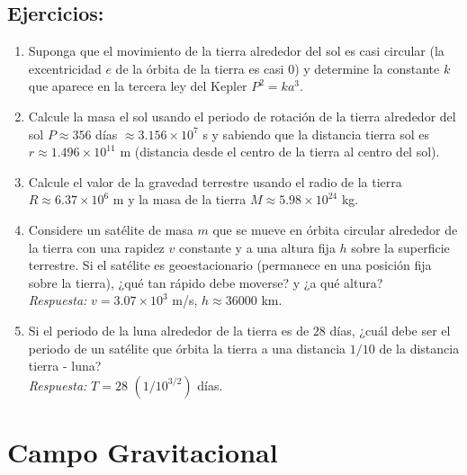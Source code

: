 \subsection{Ejercicios:}
\begin{enumerate}

\item Suponga que el movimiento de la tierra alrededor del sol es casi circular (la excentricidad $e$ de la órbita de la tierra es casi $0$) y determine la constante $k$ que aparece en la tercera ley del Kepler $P^2=ka^3$.

\item Calcule la masa el sol usando el periodo de rotación de la tierra alrededor del sol $P \approx 356$ días $\approx 3.156 \times 10^7$ s y sabiendo que la distancia tierra sol es $r \approx 1.496 \times 10^{11}$ m (distancia desde el centro de la tierra al centro del sol).

\item Calcule el valor de la gravedad terrestre usando el radio de la tierra $R\approx 6.37 \times 10^6$ m y la masa de la tierra $M \approx 5.98 \times 10^24$ kg.

\item Considere un satélite de masa $m$ que se mueve en órbita circular alrededor de la tierra con una rapidez $v$ constante y a una altura fija $h$ sobre la superficie terrestre. Si el satélite es geoestacionario (permanece en una posición fija sobre la tierra), ¿qué tan rápido debe moverse? y ¿a qué altura?\\
\textit{Respuesta:} $v=3.07 \times 10^3$ m/s, $h \approx 36000$ km.

\item Si el periodo de la luna alrededor de la tierra es de $28$ días, ¿cuál debe ser el periodo de un satélite que órbita la tierra a una distancia $1/10$ de la distancia tierra - luna?\\
\textit{Respuesta:} $T=28$ $(1/10^{3/2})$ días.

\end{enumerate}









\section{Campo Gravitacional}

